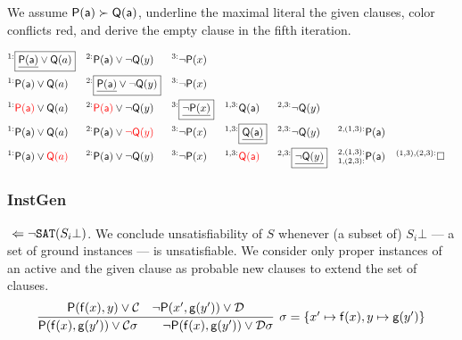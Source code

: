 \begin{example} We assume \( \mathsf{P}(\mathsf{a})\succ\mathsf{Q}(\mathsf{a}) \),
	underline the maximal literal the given clauses,
	color conflicts red,
	 and derive the empty clause in the fifth iteration.

	\begin{align*}
	^{1:}&\boxed{\underline{\mP(\ma)}\lor\mQ(a)}
	& ^{2:}&\mP(\ma)\lor\lnot\mQ(y) & ^{3:}&\lnot\mP(x)
	\\
	^{1:}&\mP(\ma)\lor\mQ(a)
	& ^{2:}&\boxed{\underline{\mP(\ma)}\lor\lnot\mQ(y)} & ^{3:}&\lnot\mP(x)
	\\
	^{1:}&{\colLo\mP(\ma)}\lor\mQ(a)
	& ^{2:}&{\colLo\mP(\ma)}\lor\lnot\mQ(y)
	& ^{3:}&\boxed{\underline{\lnot\mP(x)}}
	& ^{1,3:}&\mQ(\ma)
	& ^{2,3:}&\lnot\mQ(y)
	\\
	^{1:}&\mP(\ma)\lor\mQ(a)
	& ^{2:}&\mP(\ma)\lor{\colLo\lnot\mQ(y)}
	& ^{3:}&\lnot\mP(x)
	& ^{1,3:}&\boxed{\underline{\mQ(\ma)}}
	& ^{2,3:}&\lnot\mQ(y)
	& ^{2,(1,3):}&\mP(\ma)
	\\
	^{1:}&\mP(\ma)\lor{\colLo\mQ(a)}
	& ^{2:}&\mP(\ma)\lor\lnot\mQ(y)
	& ^{3:}&\lnot\mP(x)
	& ^{1,3:}&\colLo\mQ(\ma)
	& ^{2,3:}&\boxed{\underline{\lnot\mQ(y)}}
	& ^{2,(1,3):}_{1,(2,3):}&\mP(\ma)
	& ^{(1,3),(2,3):}&\emptyclause
	\\
	\end{align*}
\end{example}

\subsubsection{InstGen}

\jek{} \( \ \Leftarrow \lnot\texttt{SAT}(S_i\bot) \). We conclude unsatisfiability of \( S \) whenever (a subset of) \( S_i\bot \) --- a set of ground instances --- is unsatisfiable.
We consider only proper instances of an active and the given clause as probable new clauses to extend the set of clauses.
\begin{gather*}
	\infer[\sigma=\{ x'\mapsto\mf(x), y\mapsto\mg(y') \}]{
		\mP(\mf(x),\mg(y')) \lor\mcC\sigma
		\qquad
		\lnot\mP(\mf(x),\mg(y'))\lor\mcD\sigma
	}{
		\mP(\mf(x), y) \lor \mcC & \lnot\mP(x',\mg(y')) \lor \mcD
	}
\end{gather*}


